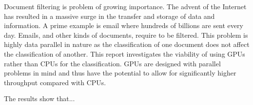 Document filtering is problem of growing importance. The advent of the Internet
has resulted in a massive surge in the transfer and storage of data and
information. A prime example is email where hundreds of billions are sent every
day. Emails, and other kinds of documents, require to be filtered. This problem
is highly data parallel in nature as the classification of one document does
not affect the classification of another. This report investigates the viability
of using GPUs rather than CPUs for the classification. GPUs are designed with
parallel problems in mind and thus have the potential to allow for significantly
higher throughput compared with CPUs.

The results show that...